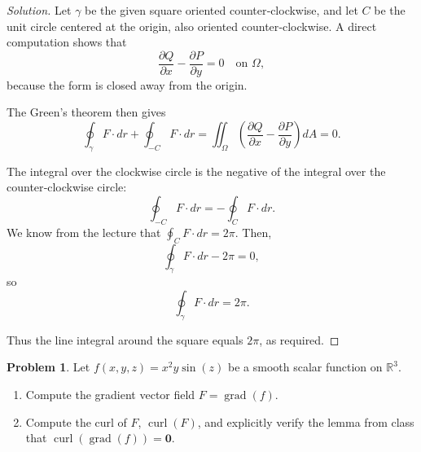 \documentclass[12pt, a4paper]{article}
\theoremstyle{definition}
\newtheorem{problem}{Problem}
\newenvironment{solution}
  {\renewcommand\qedsymbol{$\blacksquare$}\begin{proof}[Solution]}
  {\end{proof}}
\DeclareMathOperator{\curl}{curl}
\DeclareMathOperator{\grad}{grad}
\begin{document}
\begin{solution}
Let \( \gamma \) be the given square oriented counter‑clockwise, and let \( C \) be the unit circle centered at the origin, also oriented counter‑clockwise. A direct computation shows that
\[
\frac{\partial Q}{\partial x} - \frac{\partial P}{\partial y} = 0 \quad \text{on } \Omega,
\]
because the form is closed away from the origin.

The Green’s theorem then gives
\[
\oint_{\gamma} F \cdot dr + \oint_{-C} F \cdot dr = \iint_{\Omega} \left( \frac{\partial Q}{\partial x} - \frac{\partial P}{\partial y} \right) dA = 0.
\]

The integral over the clockwise circle is the negative of the integral over the counter‑clockwise circle:
\[
\oint_{-C} F \cdot dr = -\oint_{C} F \cdot dr.
\]
We know from the lecture that \( \displaystyle \oint_{C} F \cdot dr = 2\pi \). Then,
\[
\oint_{\gamma} F \cdot dr - 2\pi = 0,
\]
so
\[
\oint_{\gamma} F \cdot dr = 2\pi.
\]

Thus the line integral around the square equals \( 2\pi \), as required.
\end{solution}

\vfill


\begin{problem}
Let $f(x,y,z) = x^2 y \sin(z)$ be a smooth scalar function on $\mathbb{R}^3$.
\begin{enumerate}
    \item[(a)] Compute the gradient vector field $F = \grad(f)$.
    \item[(b)] Compute the curl of $F$, $\curl(F)$, and explicitly verify the lemma from class that $\curl(\grad(f)) = \mathbf{0}$.
\end{enumerate}
\end{problem}
\end{document}
